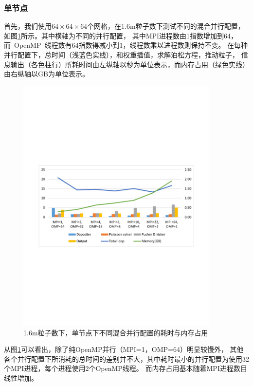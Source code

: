 \subsubsection{单节点}
首先，我们使用$64 \times 64 \times 64$个网格，在1.6m粒子数下测试不同的混合并行配置，
如图\ref{fig:PIC_speedup_Cori_1node_1_6m}所示。其中横轴为不同的并行配置，
其中MPI进程数由1指数增加到64，而~OpenMP~线程数有64指数得减小到1，线程数乘以进程数则保持不变。
在每种并行配置下，总时间（浅蓝色实线），和权重插值，求解泊松方程，推动粒子，
信息输出（各色柱行）所耗时间由左纵轴以秒为单位表示，而内存占用（绿色实线）由右纵轴以GB为单位表示。

\begin{figure}[!htb]
  \centering
  \includegraphics[width=0.9\textwidth]{Img/PIC_speedup_Cori_1node_1_6m.pdf}
  \caption{1.6m粒子数下，单节点下不同混合并行配置的耗时与内存占用}
  \label{fig:PIC_speedup_Cori_1node_1_6m}
\end{figure}

从图\ref{fig:PIC_speedup_Cori_1node_1_6m}可以看出，除了纯OpenMP并行（MPI=1，OMP=64）明显较慢外，
其他各个并行配置下所消耗的总时间的差别并不大，其中耗时最小的并行配置为使用32个MPI进程，每个进程使用2个OpenMP线程。
而内存占用基本随着MPI进程数目线性增加。

